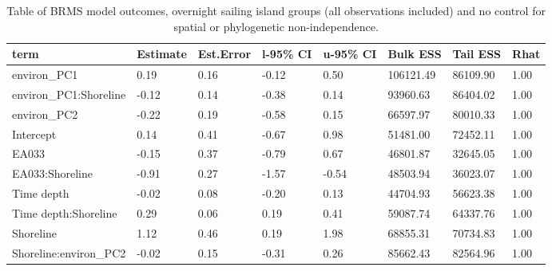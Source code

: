 \begin{table}[ht]
\centering
\begin{tabular}{p{3cm}p{1.35cm}p{1.35cm}p{1.35cm}p{1.35cm}p{1.35cm}p{1.35cm}p{1.35cm}}
  \toprule
term & Estimate & Est.Error & l-95\% CI & u-95\% CI & Bulk ESS & Tail ESS & Rhat \\ 
  \midrule
environ\_PC1 & 0.19 & 0.16 & -0.12 & 0.50 & 106121.49 & 86109.90 & 1.00 \\ 
  environ\_PC1:Shoreline & -0.12 & 0.14 & -0.38 & 0.14 & 93960.63 & 86404.02 & 1.00 \\ 
  environ\_PC2 & -0.22 & 0.19 & -0.58 & 0.15 & 66597.97 & 80010.33 & 1.00 \\ 
  Intercept & 0.14 & 0.41 & -0.67 & 0.98 & 51481.00 & 72452.11 & 1.00 \\ 
  EA033 & -0.15 & 0.37 & -0.79 & 0.67 & 46801.87 & 32645.05 & 1.00 \\ 
  EA033:Shoreline & -0.91 & 0.27 & -1.57 & -0.54 & 48503.94 & 36023.07 & 1.00 \\ 
  Time depth & -0.02 & 0.08 & -0.20 & 0.13 & 44704.93 & 56623.38 & 1.00 \\ 
  Time depth:Shoreline & 0.29 & 0.06 & 0.19 & 0.41 & 59087.74 & 64337.76 & 1.00 \\ 
  Shoreline & 1.12 & 0.46 & 0.19 & 1.98 & 68855.31 & 70734.83 & 1.00 \\ 
  Shoreline:environ\_PC2 & -0.02 & 0.15 & -0.31 & 0.26 & 85662.43 & 82564.96 & 1.00 \\ 
   \bottomrule
\end{tabular}
\caption{Table of BRMS model outcomes, overnight sailing island groups (all observations included) and no control for spatial or phylogenetic non-independence.} 
\label{BRMS_effects_SBZR_control_none}
\end{table}
